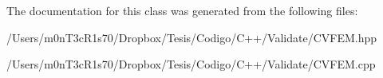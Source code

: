 The documentation for this class was generated from the following files\+:\begin{DoxyCompactItemize}
\item 
/\+Users/m0n\+T3c\+R1s70/\+Dropbox/\+Tesis/\+Codigo/\+C++/\+Validate/C\+V\+F\+E\+M.\+hpp\item 
/\+Users/m0n\+T3c\+R1s70/\+Dropbox/\+Tesis/\+Codigo/\+C++/\+Validate/C\+V\+F\+E\+M.\+cpp\end{DoxyCompactItemize}
